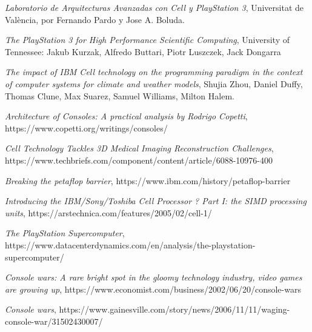 \documentclass[10pt,compsoc]{IEEEtran}
\begin{document}
	
		\begin{thebibliography}{1}
			
			{\it{Laboratorio de Arquitecturas Avanzadas con Cell y PlayStation 3}}, Universitat de València, por Fernando Pardo y Jose A. Boluda.\newline
			
			{\it{The PlayStation 3 for High Performance Scientific Computing}}, University of Tennessee: Jakub Kurzak, Alfredo Buttari, Piotr Luszczek, Jack Dongarra\newline
			
			{\it{The impact of IBM Cell technology on the programming paradigm in the context of computer systems	for climate and weather	models}}, Shujia Zhou, Daniel Duffy, Thomas Clune, Max Suarez, 	Samuel Williams, Milton Halem.\newline
			
			{\it{Architecture of Consoles: A practical analysis by Rodrigo Copetti}}, 
			https://www.copetti.org/writings/consoles/\newline
			
			{\it{Cell Technology Tackles 3D Medical Imaging Reconstruction Challenges}}, https://www.techbriefs.com/component/content/article/6088-10976-400\newline
			
			{\it{Breaking the petaflop barrier}},
			https://www.ibm.com/history/petaflop-barrier\newline
			
			{\it{Introducing the IBM/Sony/Toshiba Cell Processor ? Part I: the SIMD processing units}},
			https://arstechnica.com/features/2005/02/cell-1/\newline
			
			{\it{The PlayStation Supercomputer}}, https://www.datacenterdynamics.com/en/analysis/the-playstation-supercomputer/\newline
	
			{\it{Console wars: A rare bright spot in the gloomy technology industry, video games are growing up}}, 
			https://www.economist.com/business/2002/06/20/console-wars\newline
			

			{\it{Console wars}}, 			
			https://www.gainesville.com/story/news/2006/11/11/waging-console-war/31502430007/\newline
			

\end{thebibliography}
\end{document}
